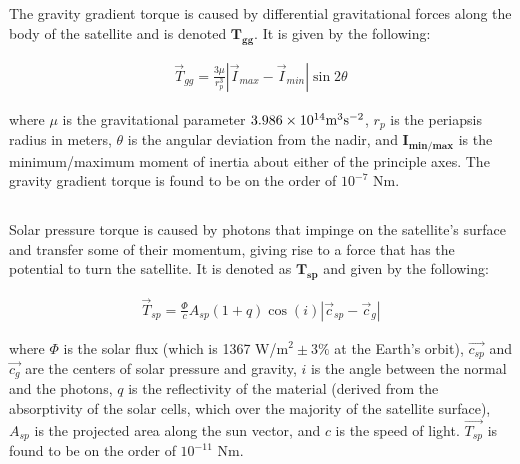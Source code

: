 \documentclass{article}
\begin{document}
\subsection{\color{black}{Gravity Gradient}}

The gravity gradient torque is caused by differential gravitational forces along the body of the satellite and is denoted $\mathbf{T_{gg}}$. It is given by the following:

\begin{align}
    \vec{T}_{gg} = \frac{3 \mu}{r_{p}^3}|\vec{I}_{max}-\vec{I}_{min}|\sin{2 \theta} \tag{2.1}
\end{align}

 where $\mu$ is the gravitational parameter $3.986 \times 10^{14} \textup{m}^3 \textup{s}^{-2}$, $r_{p}$ is the periapsis radius in meters, $\theta$ is the angular deviation from the nadir, and $\mathbf{I_{min/max}}$ is the minimum/maximum moment of inertia about either of the principle axes. The gravity gradient torque is found to be on the order of $10^{-7}$ Nm.

\subsection{\color{black}{Solar Pressure}}

Solar pressure torque is caused by photons that impinge on the satellite's surface and transfer some of their momentum, giving rise to a force that has the potential to turn the satellite. It is denoted as $\mathbf{T_{sp}}$ and given by the following:

\begin{align}
    \vec{T}_{sp} = \frac{\Phi}{c}A_{sp}(1+q)\cos{(i)}|\vec{c}_{sp} - \vec{c}_{g}| \tag{2.2}
\end{align}

 where $\Phi$ is the solar flux (which is 1367 W/m$^{2} \pm 3\%$ at the Earth's orbit), $\vec{c_{sp}}$ and $\vec{c_{g}}$ are the centers of solar pressure and gravity, $i$ is the angle between the normal and the photons, $q$ is the reflectivity of the material (derived from the absorptivity of the solar cells, which over the majority of the satellite surface), $A_{sp}$ is the projected area along the sun vector, and $c$ is the speed of light. $\vec{T_{sp}}$ is found to be on the order of $10^{-11}$ Nm.

\subsection{\color{black}{Aerodynamic Drag}}
\end{document}
